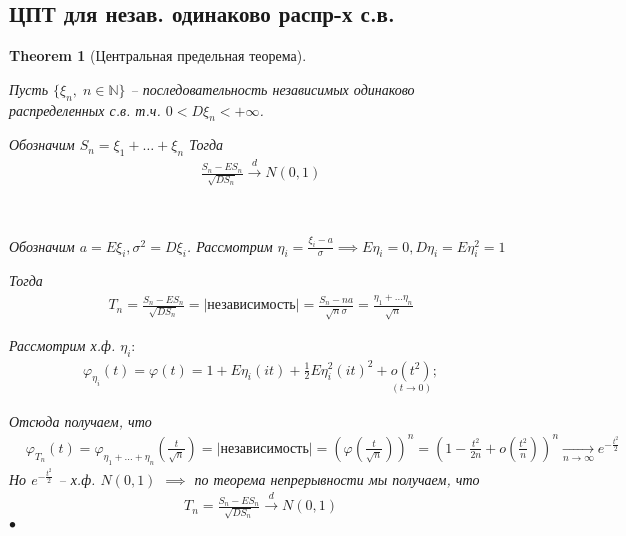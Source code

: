 \documentclass[a4paper]{article}
\theoremstyle{plain}
\newtheorem{theorem}{Theorem}
\theoremstyle{remark}
\theoremstyle{definition}
\renewenvironment{proof}{{\bfseries Proof}}{$\bullet$}
\newcommand{\pars}[1]{\left( #1 \right)}
\newcommand{\setN}{\mathbb{N}}
\newcommand{\walls}[1]{\left | #1 \right |} %
\newcommand{\expl}[1]{\walls{\text{#1}}} %
\newcommand{\toup}[1]{\xrightarrow{#1}}
\newcommand{\todown}[1]{\xrightarrow[#1]{}}
\renewcommand{\phi}{\varphi}
\begin{document}
\subsection{ЦПТ для незав. одинаково распр-х с.в.}
\begin{theorem}[Центральная предельная теорема]~

  Пусть $\{ \xi_n,\; n \in \setN \}$ -- 
  последовательность независимых одинаково распределенных с.в. т.ч. 
  $0 < D \xi_n < +\infty$. 

  Обозначим $S_n = \xi_1 + \ldots + \xi_n$
  Тогда
  \begin{align*}
    \frac{S_n - E S_n}{\sqrt{D S_n}} \toup{d} N(0, 1)
  \end{align*}

  \begin{proof}~

    Обозначим $a = E \xi_i, \sigma^2 = D \xi_i$. 
    Рассмотрим $\eta_i = \frac{\xi_i - a}{\sigma}
    \implies E \eta_i = 0, D \eta_i = E \eta_i^2 = 1$

    Тогда
    \begin{align*}
      T_n = \frac{S_n - E S_n}{\sqrt{D S_n}} = \expl{независимость}
      = \frac{S_n - na}{\sqrt{n} \sigma} = \frac{\eta_1 + \ldots \eta_n}{\sqrt{n}}
    \end{align*}

    Рассмотрим х.ф. $\eta_i:$
    \begin{align*}
      \phi_{\eta_i} (t) = \phi(t) = 1 + E \eta_i (i t) + 
      \frac{1}{2} E \eta_i^2 (it)^2 + \underset{(t \to 0)}{o(t^2)};
    \end{align*} 

    Отсюда получаем, что 
    \begin{align*}
      &\phi_{T_n} (t) = \phi_{\eta_1 + \ldots + \eta_n} (\frac{t}{\sqrt{n}}) 
      = \expl{независимость} = \pars{\phi\pars{\frac{t}{\sqrt{n}}}}^n 
      = \pars{1 - \frac{t^2}{2n} + o\pars{\frac{t^2}{n}}}^n 
      \todown{n \to \infty} e^{- \frac{t^2}{2}}
    \end{align*}
    Но $e^{-\frac{t^2}{2}}$ -- х.ф. $N(0, 1)$ 
    $\implies$ по теорема непрерывности мы получаем, что 
    \begin{align*}
      T_n = \frac{S_n - E S_n}{\sqrt{D S_n}} \toup{d} N(0, 1)
    \end{align*}
  \end{proof}
\end{theorem}
\end{document}
